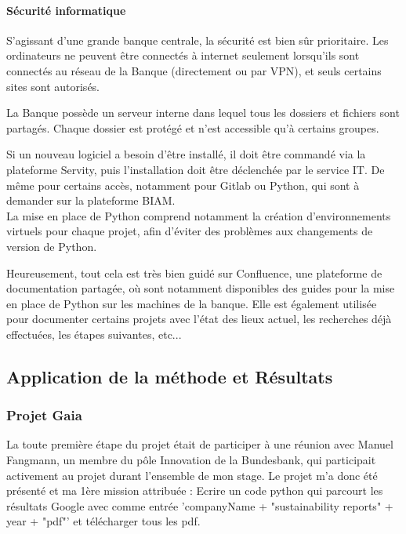 \paragraph{Sécurité informatique}

S'agissant d'une grande banque centrale, la sécurité est bien sûr prioritaire. 
Les ordinateurs ne peuvent être connectés à internet seulement lorsqu'ils sont connectés au réseau de la Banque (directement ou par VPN), et seuls certains sites sont autorisés.

La Banque possède un serveur interne dans lequel tous les dossiers et fichiers sont partagés. 
Chaque dossier est protégé et n'est accessible qu'à certains groupes.

Si un nouveau logiciel a besoin d'être installé, il doit être commandé via la plateforme Servity, puis l'installation doit être déclenchée par le service IT.
De même pour certains accès, notamment pour Gitlab ou Python, qui sont à demander sur la plateforme BIAM.
\\

La mise en place de Python comprend notamment la création d'environnements virtuels pour chaque projet, afin d'éviter des problèmes aux changements de version de Python.

Heureusement, tout cela est très bien guidé sur Confluence, une plateforme de documentation partagée, où sont notamment disponibles des guides pour la mise en place de Python sur les machines de la banque.
Elle est également utilisée pour documenter certains projets avec l'état des lieux actuel, les recherches déjà effectuées, les étapes suivantes, etc...

\subsection{Application de la méthode et Résultats}

\subsubsection{Projet Gaia}

La toute première étape du projet était de participer à une réunion avec Manuel Fangmann, un membre du pôle Innovation de la Bundesbank, qui participait activement au projet durant l'ensemble de mon stage.
Le projet m'a donc été présenté et ma 1ère mission attribuée : Ecrire un code python qui parcourt les résultats Google avec comme entrée 'companyName + "sustainability reports" + year + "pdf"' et télécharger tous les pdf.

